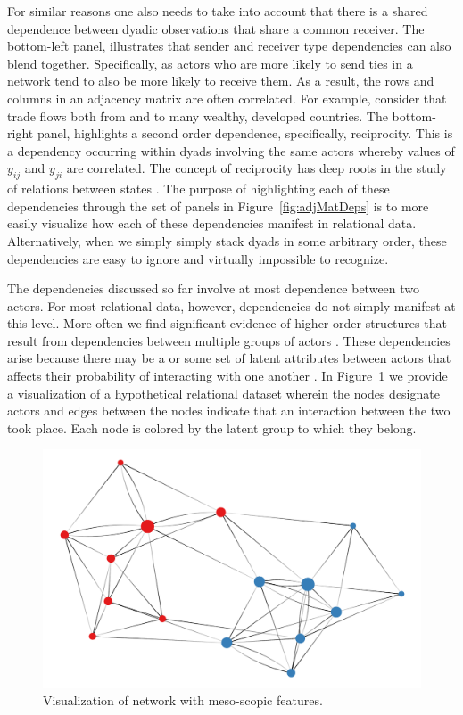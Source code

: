 For similar reasons one also needs to take into account that there is a shared dependence between dyadic observations that share a common receiver. The bottom-left panel, illustrates that sender and receiver type dependencies can also blend together. Specifically, as actors who are more likely to send ties in a network tend to also be more likely to receive them. As a result, the rows and columns in an adjacency matrix are often correlated. For example, consider that trade flows both from and to many wealthy, developed countries. The bottom-right panel, highlights a second order dependence, specifically, reciprocity. This is a dependency occurring within dyads involving the same actors whereby values of $y_{ij}$ and $y_{ji}$ are correlated. The concept of reciprocity has deep roots in the study of relations between states \citep{richardson:1960,keohane:1989}. The purpose of highlighting each of these dependencies through the set of panels in Figure~\ref{fig:adjMatDeps} is to more easily visualize how each of these dependencies manifest in relational data. Alternatively, when we simply simply stack dyads in some arbitrary order, these dependencies are easy to ignore and virtually impossible to recognize.

The dependencies discussed so far involve at most dependence between two actors. For most relational data, however, dependencies do not simply manifest at this level. More often we find significant evidence of higher order structures that result from dependencies between multiple groups of actors \citep{poast:2010}. These dependencies arise because there may be a or some set of latent attributes between actors that affects their probability of interacting with one another \citep{wasserman:faust:1994,zinnes:1967}. In Figure~\ref{fig:thirdDeps} we provide a visualization of a hypothetical relational dataset wherein the nodes designate actors and edges between the nodes indicate that an interaction between the two took place. Each node is colored by the latent group to which they belong. 

\begin{figure}[ht]
	\includegraphics[width=.7\textwidth]{stochEquiv.pdf}
	\caption{Visualization of network with meso-scopic features.}
	\label{fig:thirdDeps}
\end{figure}

